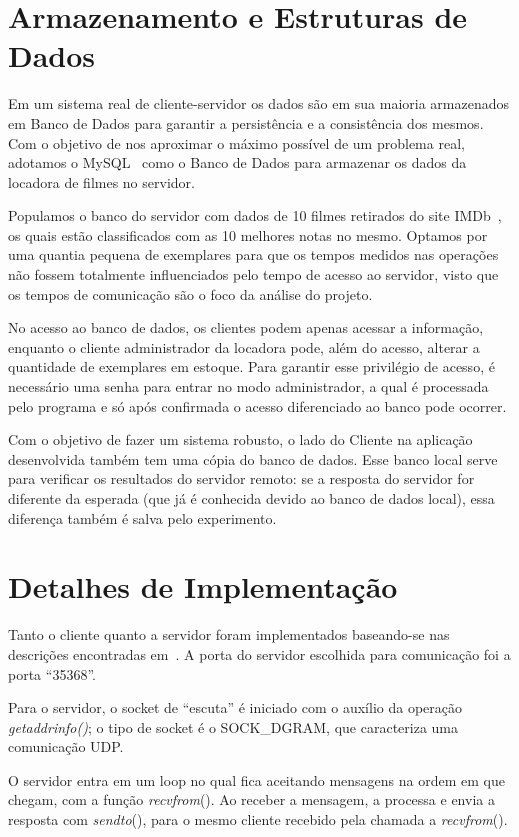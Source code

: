 \documentclass[12pt,a4paper]{article}
\begin{document}
\section{Armazenamento e Estruturas de Dados}

Em um sistema real de cliente-servidor os dados são em sua maioria armazenados em Banco de Dados para garantir a persistência e a consistência dos mesmos. Com o objetivo de nos aproximar o máximo possível de um problema real, adotamos o MySQL~\cite{mysql1995mysql} como o Banco de Dados para armazenar os dados da locadora de filmes no servidor.

    Populamos o banco do servidor com dados de 10 filmes retirados do site IMDb~\cite{IMDbsite}, os quais estão classificados com as 10 melhores notas no mesmo. Optamos por uma quantia pequena de exemplares para que os tempos medidos nas operações não fossem totalmente influenciados pelo tempo de acesso ao servidor, visto que os tempos de comunicação são o foco da análise do projeto.
    
    No acesso ao banco de dados, os clientes podem apenas acessar a informação, enquanto o cliente administrador da locadora pode, além do acesso, alterar a quantidade de exemplares em estoque. Para garantir esse privilégio de acesso, é necessário uma senha para entrar no modo administrador, a qual é processada pelo programa e só após confirmada o acesso diferenciado ao banco pode ocorrer.
    
Com o objetivo de fazer um sistema robusto, o lado do Cliente na aplicação desenvolvida também tem uma cópia do banco de dados. Esse banco local serve para verificar os resultados do servidor remoto: se a resposta do servidor for diferente da esperada (que já é conhecida devido ao banco de dados local), essa diferença também é salva pelo experimento. 

\section{Detalhes de Implementação}

Tanto o cliente quanto a servidor foram implementados baseando-se nas descrições encontradas em~\cite{hall19beej}. A porta do servidor escolhida para comunicação foi a porta “35368”.

Para o servidor, o socket de “escuta” é iniciado com o auxílio da operação {\it getaddrinfo()}; o tipo de socket é o SOCK\_DGRAM, que caracteriza uma comunicação UDP.

O servidor entra em um loop no qual fica aceitando mensagens na ordem em que chegam, com a função {\it recvfrom}(). Ao receber a mensagem, a processa e envia a resposta com {\it sendto}(), para o mesmo cliente recebido pela chamada a {\it recvfrom}().
\end{document}
